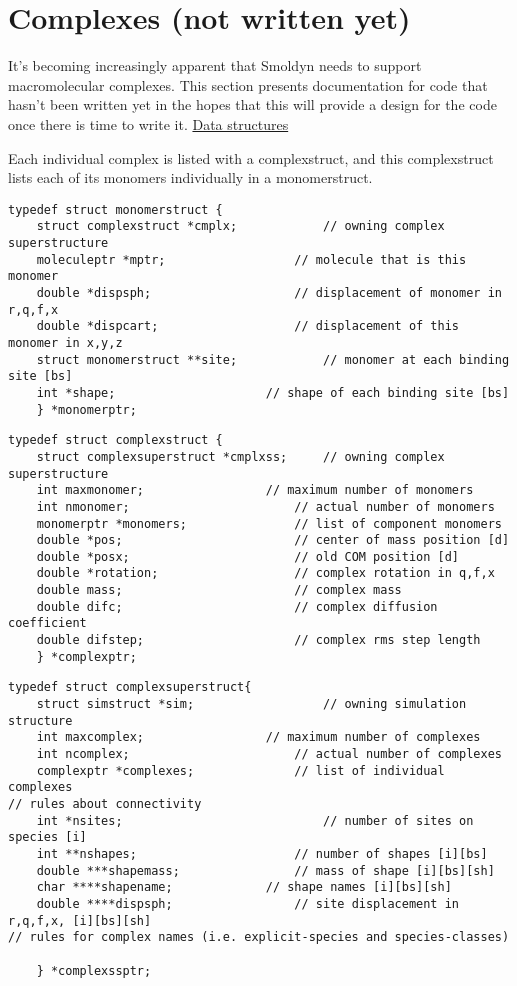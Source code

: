 \documentclass {scrbook}
\begin{document}
\section{Complexes (not written yet)}

It's becoming increasingly apparent that Smoldyn needs to support macromolecular complexes. This section presents documentation for code that hasn't been written yet in the hopes that this will provide a design for the code once there is time to write it.
\newline
\newline
\underline{Data structures}

Each individual complex is listed with a complexstruct, and this complexstruct lists each of its monomers individually in a monomerstruct.

\begin{lstlisting}
typedef struct monomerstruct {
	struct complexstruct *cmplx;			// owning complex superstructure
	moleculeptr *mptr;					// molecule that is this monomer
	double *dispsph;					// displacement of monomer in r,q,f,x
	double *dispcart;					// displacement of this monomer in x,y,z
	struct monomerstruct **site;			// monomer at each binding site [bs]
	int *shape;						// shape of each binding site [bs]
	} *monomerptr;
\end{lstlisting}


\begin{lstlisting}
typedef struct complexstruct {
	struct complexsuperstruct *cmplxss;		// owning complex superstructure
	int maxmonomer;					// maximum number of monomers
	int nmonomer;						// actual number of monomers
	monomerptr *monomers;				// list of component monomers
	double *pos;						// center of mass position [d]
	double *posx;						// old COM position [d]
	double *rotation;					// complex rotation in q,f,x
	double mass;						// complex mass
	double difc;						// complex diffusion coefficient
	double difstep;						// complex rms step length
	} *complexptr;
\end{lstlisting}


\begin{lstlisting}
typedef struct complexsuperstruct{
	struct simstruct *sim;					// owning simulation structure
	int maxcomplex;					// maximum number of complexes
	int ncomplex;						// actual number of complexes
	complexptr *complexes;				// list of individual complexes
// rules about connectivity
	int *nsites;							// number of sites on species [i]
	int **nshapes;						// number of shapes [i][bs]
	double ***shapemass;				// mass of shape [i][bs][sh]
	char ****shapename;				// shape names [i][bs][sh]
	double ****dispsph;					// site displacement in r,q,f,x, [i][bs][sh]
// rules for complex names (i.e. explicit-species and species-classes)
	
	} *complexssptr;
\end{lstlisting}
\end{document}
